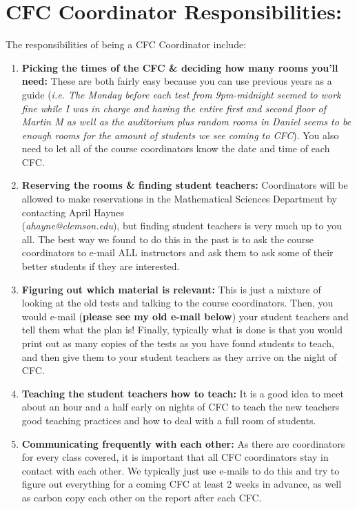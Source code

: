 \documentclass[paper=a4, fontsize=11pt]{scrartcl} %
\numberwithin{equation}{section} %
\numberwithin{figure}{section} %
\numberwithin{table}{section} %
\begin{document}

\section*{\textbf{CFC Coordinator Responsibilities:}}

The responsibilities of being a CFC Coordinator include: 

\begin{enumerate}
\item \textbf{Picking the times of the CFC \& deciding how many rooms you'll need:} These are both fairly easy because you can use previous years as a guide (\textit{i.e. The Monday before each test from 9pm-midnight seemed to work fine while I was in charge and having the entire first and second floor of Martin M as well as the auditorium plus random rooms in Daniel seems to be enough rooms for the amount of students we see coming to CFC}).  You also need to let all of the course coordinators know the date and time of each CFC.
\item \textbf{Reserving the rooms \& finding student teachers:} Coordinators will be allowed to make reservations in the Mathematical Sciences Department by contacting April Haynes \\ (\textit{ahayne@clemson.edu}), but finding student teachers is very much up to you all.  The best way we found to do this in the past is to ask the course coordinators to e-mail ALL instructors and ask them to ask some of their better students if they are interested.
\item \textbf{Figuring out which material is relevant:} This is just a mixture of looking at the old tests and talking to the course coordinators.  Then, you would e-mail (\textbf{please see my old e-mail below}) your student teachers and tell them what the plan is! Finally, typically what is done is that you would print out as many copies of the tests as you have found students to teach, and then give them to your student teachers as they arrive on the night of CFC.
\item \textbf{Teaching the student teachers how to teach:} It is a good idea to meet about an hour and a half early on nights of CFC to teach the new teachers good teaching practices and how to deal with a full room of students.
\item \textbf{Communicating frequently with each other:} As there are coordinators for every class covered, it is important that all CFC coordinators stay in contact with each other.  We typically just use e-mails to do this and try to figure out everything for a coming CFC at least 2 weeks in advance, as well as carbon copy each other on the report after each CFC.

\end{enumerate}
\end{document}
